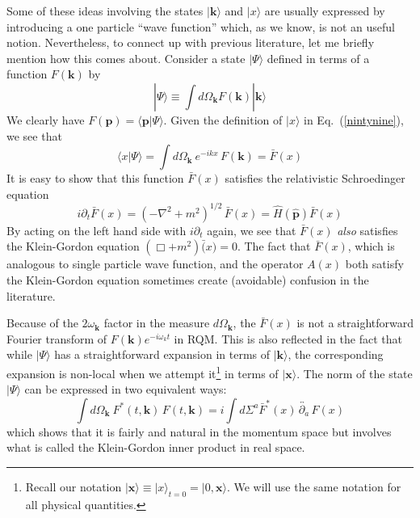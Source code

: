 \documentclass{article}
\def\eq#1{{Eq.~(\ref{#1})}}
\def\ket#1{|#1\rangle}                    %
\def\amp#1#2{\langle #1 | #2\rangle}      %
\begin{document}
Some of these ideas involving the states $\ket{\bm{k}}$ and $\ket{x}$ are usually expressed by introducing a one particle ``wave function''
which, as we know, is not an useful notion. Nevertheless, to connect up with previous literature, let me briefly mention how this comes about. Consider a state $\ket{\Psi}$ defined in terms of a function $F(\bm{k})$ by
 \begin{equation}
 \ket{\Psi} \equiv \int d\Omega_{\bm{k}} F(\bm{k}) \ket{\bm{k}} 
  \label{14oct18}
 \end{equation} 
 We clearly have $F(\bm{p}) = \amp{\bm{p}}{\Psi}$. Given the definition of $\ket{x}$ in \eq{nintynine}, we see that 
 \begin{equation}
 \amp{x}{\Psi} = \int d\Omega_{\bm{k}}\ e^{-ikx}\, F(\bm{k}) = \bar F(x)
 \end{equation} 
 It is  easy to show that this function $\bar F(x)$ satisfies the relativistic Schroedinger equation 
 \begin{equation}
 i\partial_t \bar F(x) = (-\nabla^2+ m^2)^{1/2} \, \bar F(x) = \hat H(\hat{\bm{p}}) \bar F(x)
 \end{equation}
 By acting on the left hand side with $i\partial_t$ again, we see that $\bar F(x)$ \textit{also} satisfies the Klein-Gordon equation $(\Box +m^2)\bar (x) =0$. The fact that $\bar F(x)$, which is analogous to single particle wave function, and the operator $A(x)$ both satisfy the Klein-Gordon equation sometimes create (avoidable) confusion in the literature.
 
 Because of the $2\omega_{\bm{k}}$ factor in the measure $d\Omega_{\bm{k}}$, the  $\bar F(x)$ is not a straightforward Fourier transform of $F(\bm{k})e^{-i\omega_k t}$ in RQM. This is also reflected in the fact that while $\ket{\Psi}$ has a straightforward expansion in terms of $\ket{\bm{k}}$, the corresponding expansion is non-local when we attempt it\footnote{Recall our notation 
 $
 \ket{\bm{x}} \equiv \ket{x}_{t=0} = \ket{0,\bm{x}}
 $.  We will use the same notation for all physical quantities.}
 in terms of $\ket{\bm{x}}$.
 The norm of the state $\ket{\Psi}$ can be expressed in two equivalent ways: 
 \begin{equation}
 \int d\Omega_{\bm{k}} \ F^*(t,\bm{k})\, F(t, \bm{k}) = i \int d \Sigma^a \bar F^*(x)\, \overleftrightarrow{\partial_a} \, F(x)
 \end{equation} 
which shows that it is fairly and natural in the momentum space but involves what is called the Klein-Gordon inner product in real space.
 
\end{document}
